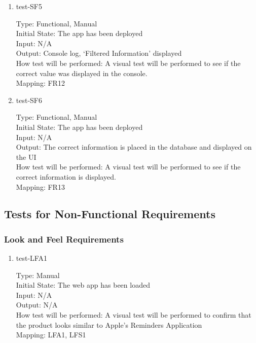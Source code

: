 \documentclass[12pt, titlepage]{article}
\begin{document}
\begin{enumerate}
\item{test-SF5\\}

Type: Functional, Manual\\
Initial State: The app has been deployed\\
Input: N/A\\
Output: Console log, ‘Filtered Information’ displayed\\
How test will be performed: A visual test will be performed to see if the correct value was displayed in the console.\\
Mapping: FR12


\item{test-SF6\\}

Type: Functional, Manual\\
Initial State: The app has been deployed\\
Input: N/A\\
Output: The correct information is placed in the database and displayed on the UI\\
How test will be performed: A visual test will be performed to see if the correct information is displayed.\\
Mapping: FR13

\end{enumerate}

\color{black}
\subsection{Tests for Non-Functional Requirements}

\subsubsection{Look and Feel Requirements}

\begin{enumerate}
\item {test-LFA1\\}

Type: Manual\\
Initial State: The web app has been loaded\\
Input: N/A\\
Output: N/A\\
How test will be performed: A visual test will be performed to confirm that the product looks similar to Apple’s Reminders Application\\
Mapping: LFA1, LFS1

\end{enumerate}
\end{document}
